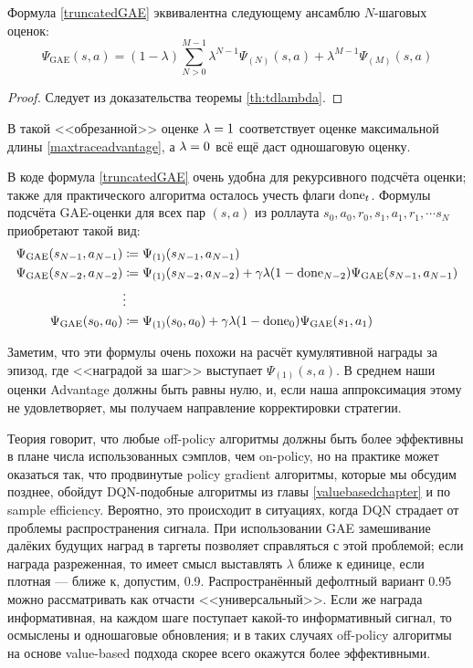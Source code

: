 \begin{proposition}
Формула \eqref{truncatedGAE} эквивалентна следующему ансамблю $N$-шаговых оценок:
$$\Psi_{\mathrm{GAE}}(s, a) = (1 - \lambda) \sum_{N > 0}^{M-1} \lambda^{N-1} \Psi_{(N)}(s, a) + \lambda^{M-1} \Psi_{(M)}(s, a)$$
\begin{proof}
Следует из доказательства теоремы \ref{th:tdlambda}.
\end{proof}
\end{proposition}

В такой <<обрезанной>> оценке $\lambda \HM= 1$ соответствует оценке максимальной длины \eqref{maxtraceadvantage}, а $\lambda \HM= 0$ всё ещё даст одношаговую оценку.

В коде формула \eqref{truncatedGAE} очень удобна для рекурсивного подсчёта оценки; также для практического алгоритма осталось учесть флаги $\mathrm{done}_t$. Формулы подсчёта GAE-оценки для всех пар $(s, a)$ из роллаута $s_0, a_0, r_0, s_1, a_1, r_1, \cdots s_N$ приобретают такой вид:
\begin{equation*}
\begin{split}
\Psi_{\mathrm{GAE}}(s_{N-1}, a_{N-1}) &\coloneqq \Psi_{(1)}(s_{N-1}, a_{N-1}) \\
\Psi_{\mathrm{GAE}}(s_{N-2}, a_{N-2}) &\coloneqq \Psi_{(1)}(s_{N-2}, a_{N-2}) + \gamma \lambda (1 - \mathrm{done}_{N-2}) \Psi_{\mathrm{GAE}}(s_{N-1}, a_{N-1}) \\
&\vdots \\
\Psi_{\mathrm{GAE}}(s_0, a_0) &\coloneqq \Psi_{(1)}(s_0, a_0) + \gamma \lambda (1 - \mathrm{done}_0) \Psi_{\mathrm{GAE}}(s_1, a_1)
\end{split}
\end{equation*}

Заметим, что эти формулы очень похожи на расчёт кумулятивной награды за эпизод, где <<наградой за шаг>> выступает $\Psi_{(1)}(s, a)$. В среднем наши оценки Advantage должны быть равны нулю, и, если наша аппроксимация этому не удовлетворяет, мы получаем направление корректировки стратегии.

\begin{remark}
Теория говорит, что любые off-policy алгоритмы должны быть более эффективны в плане числа использованных сэмплов, чем on-policy, но на практике может оказаться так, что продвинутые policy gradient алгоритмы, которые мы обсудим позднее, обойдут DQN-подобные алгоритмы из главы \ref{valuebasedchapter} и по sample efficiency. Вероятно, это происходит в ситуациях, когда DQN страдает от проблемы распространения сигнала. При использовании GAE замешивание далёких будущих наград в таргеты позволяет справляться с этой проблемой; если награда разреженная, то имеет смысл выставлять $\lambda$ ближе к единице, если плотная --- ближе к, допустим, 0.9. Распространённый дефолтный вариант 0.95 можно рассматривать как отчасти <<универсальный>>. Если же награда информативная, на каждом шаге поступает какой-то информативный сигнал, то осмыслены и одношаговые обновления; и в таких случаях off-policy алгоритмы на основе value-based подхода скорее всего окажутся более эффективными.
\end{remark}

